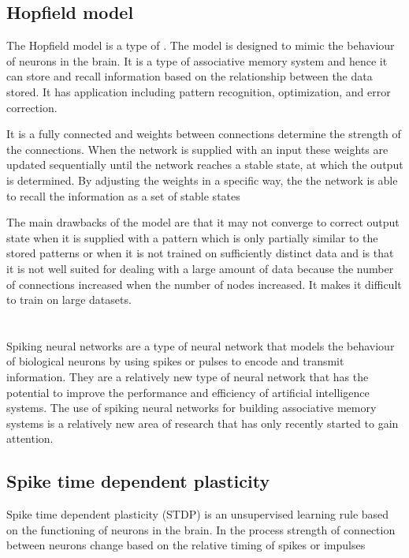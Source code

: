 \subsection{Hopfield model}
The Hopfield model \cite{hopfield} is a type of \rnn. The model is designed to
mimic the behaviour of neurons in the brain. It is a type of associative memory
system and hence it can store and recall information based on the relationship
between the data stored. It has application including pattern recognition,
optimization, and error correction.

It is a fully connected \nn and weights between connections determine the
strength of the connections. When the network is supplied with an input these
weights are updated sequentially until the network reaches a stable state, at
which the output is determined. By adjusting the weights in a specific way, the
the network is able to recall the information as a set of stable states

The main drawbacks of the model are that it may not converge to correct output
state when it is supplied with a pattern which is only partially similar to the
stored patterns or when it is not trained on sufficiently distinct data and is
that it is not well suited for dealing with a large amount of data because the
number of connections increased when the number of nodes increased. It makes it
difficult to train on large datasets.

\section{\Snn}
Spiking neural networks are a type of neural network that models the behaviour
of biological neurons by using spikes or pulses to encode and transmit
information. They are a relatively new type of neural network that has the
potential to improve the performance and efficiency of artificial intelligence
systems. The use of spiking neural networks for building associative memory
systems is a relatively new area of research that has only recently started to
gain attention.
\subsection{Spike time dependent plasticity}
Spike time dependent plasticity (STDP) is an unsupervised learning rule based
on the functioning of neurons in the brain. In the process strength of
connection between neurons change based on the relative timing of spikes or
impulses

